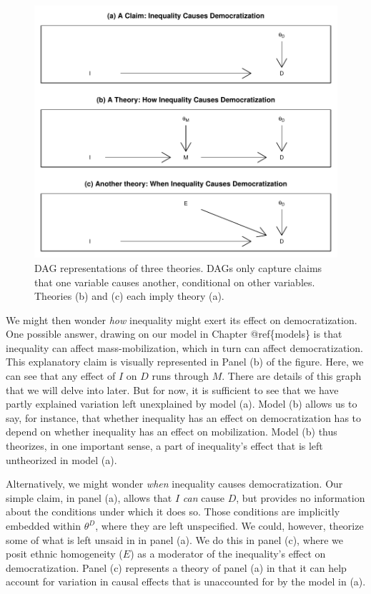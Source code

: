 \documentclass[12pt,]{book}
\begin{document}
\begin{figure}

{\centering \includegraphics[width=.5\textwidth]{ii_files/figure-latex/demtheory5-1} 

}

\caption{DAG representations of three theories. DAGs only capture claims that one variable causes another, conditional on other variables. Theories (b) and (c) each imply theory (a).}\label{fig:demtheory5}
\end{figure}

We might then wonder \emph{how} inequality might exert its effect on democratization. One possible answer, drawing on our model in Chapter @ref\{models\} is that inequality can affect mass-mobilization, which in turn can affect democratization. This explanatory claim is visually represented in Panel (b) of the figure. Here, we can see that any effect of \(I\) on \(D\) runs through \(M\). There are details of this graph that we will delve into later. But for now, it is sufficient to see that we have partly explained variation left unexplained by model (a). Model (b) allows us to say, for instance, that whether inequality has an effect on democratization has to depend on whether inequality has an effect on mobilization. Model (b) thus theorizes, in one important sense, a part of inequality's effect that is left untheorized in model (a).

Alternatively, we might wonder \emph{when} inequality causes democratization. Our simple claim, in panel (a), allows that \(I\) \emph{can} cause \(D\), but provides no information about the conditions under which it does so. Those conditions are implicitly embedded within \(\theta^D\), where they are left unspecified. We could, however, theorize some of what is left unsaid in in panel (a). We do this in panel (c), where we posit ethnic homogeneity (\(E\)) as a moderator of the inequality's effect on democratization. Panel (c) represents a theory of panel (a) in that it can help account for variation in causal effects that is unaccounted for by the model in (a).
\end{document}
